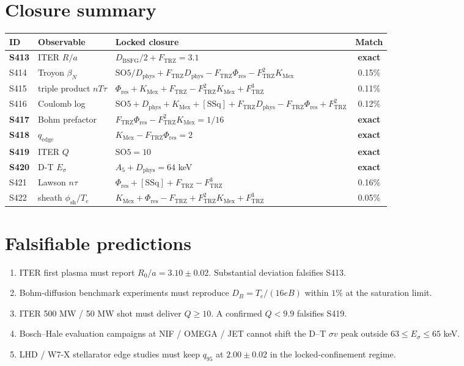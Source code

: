 \documentclass[11pt]{article}
\newcommand{\Ftrz}{F_{\mathrm{TRZ}}}
\newcommand{\Phires}{\Phi_{\mathrm{res}}}
\newcommand{\KMex}{K_{\mathrm{Mex}}}
\newcommand{\Dphys}{D_{\mathrm{phys}}}
\newcommand{\Dbsfg}{D_{\mathrm{BSFG}}}
\newcommand{\SOfive}{\mathrm{SO5}}
\newcommand{\Afive}{A_{5}}
\newcommand{\SSq}{[\mathrm{SSq}]}
\begin{document}
\section{Closure summary}
\begin{table}[h!]
\centering
\begin{tabular}{lllc}
\toprule
ID & Observable & Locked closure & Match \\
\midrule
\textbf{S413} & ITER $R/a$            & $\Dbsfg/2+\Ftrz=3.1$                                  & \textbf{exact} \\
S414 & Troyon $\beta_{N}$              & $\SOfive/\Dphys+\Ftrz\Dphys-\Ftrz\Phires-\Ftrz^{2}\KMex$ & 0.15\% \\
S415 & triple product $nT\tau$         & $\Phires+\KMex+\Ftrz-\Ftrz^{2}\KMex+\Ftrz^{3}$         & 0.11\% \\
S416 & Coulomb log                     & $\SOfive+\Dphys+\KMex+\SSq+\Ftrz\Dphys-\Ftrz\Phires+\Ftrz^{2}$ & 0.12\% \\
\textbf{S417} & Bohm prefactor         & $\Ftrz\Phires-\Ftrz^{2}\KMex=1/16$                    & \textbf{exact} \\
\textbf{S418} & $q_{\mathrm{edge}}$    & $\KMex-\Ftrz\Phires=2$                                 & \textbf{exact} \\
\textbf{S419} & ITER $Q$               & $\SOfive=10$                                            & \textbf{exact} \\
\textbf{S420} & D-T $E_{\sigma}$       & $\Afive+\Dphys=64$ keV                                 & \textbf{exact} \\
S421 & Lawson $n\tau$                  & $\Phires+\SSq+\Ftrz-\Ftrz^{3}$                          & 0.16\% \\
S422 & sheath $\phi_{\mathrm{sh}}/T_e$ & $\KMex+\Phires-\Ftrz+\Ftrz^{2}\KMex+\Ftrz^{3}$         & 0.05\% \\
\bottomrule
\end{tabular}
\end{table}

\section{Falsifiable predictions}
\begin{enumerate}[label=(F\arabic*)]
\item ITER first plasma must report $R_{0}/a=3.10\pm 0.02$. Substantial deviation falsifies S413.
\item Bohm-diffusion benchmark experiments must reproduce $D_{B}=T_{e}/(16 eB)$ within $1\%$ at the saturation limit.
\item ITER 500 MW / 50 MW shot must deliver $Q\geq 10$. A confirmed $Q<9.9$ falsifies S419.
\item Bosch--Hale evaluation campaigns at NIF / OMEGA / JET cannot shift the D--T $\sigma v$ peak outside $63\le E_{\sigma}\le 65$ keV.
\item LHD / W7-X stellarator edge studies must keep $q_{95}$ at $2.00\pm 0.02$ in the locked-confinement regime.
\end{enumerate}
\end{document}
